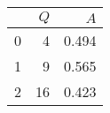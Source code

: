 \begin{tabular}{lrr}
\toprule
{} &  $Q$ &    $A$ \\
\midrule
0 &    4 &  0.494 \\
1 &    9 &  0.565 \\
2 &   16 &  0.423 \\
\bottomrule
\end{tabular}
